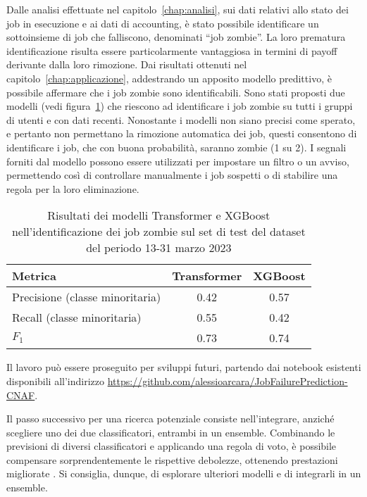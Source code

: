 \label{chap:conclusione}


Dalle analisi effettuate nel capitolo~\ref{chap:analisi}, sui dati relativi
allo stato dei job in esecuzione e ai dati di accounting, è stato possibile
identificare un sottoinsieme di job che falliscono, denominati ``job zombie''.
La loro prematura identificazione risulta essere particolarmente vantaggiosa
in termini di payoff derivante dalla loro rimozione. Dai risultati ottenuti
nel capitolo~\ref{chap:applicazione}, addestrando un apposito modello
predittivo, è possibile affermare che i job zombie sono identificabili. Sono
stati proposti due modelli (vedi figura~\ref{table:model_results}) che
riescono ad identificare i job zombie su tutti i gruppi di utenti e con dati
recenti. Nonostante i modelli non siano precisi come sperato, e pertanto non
permettano la rimozione automatica dei job, questi consentono di identificare
i job, che con buona probabilità, saranno zombie (1 su 2). I segnali forniti
dal modello possono essere utilizzati per impostare un filtro o un avviso,
permettendo così di controllare manualmente i job sospetti o di stabilire una
regola per la loro eliminazione.

\begin{table}[!ht]
    \centering
    \begin{tabular}{lcc}
        \toprule
        Metrica & Transformer & XGBoost \\ 
        \midrule
        Precisione (classe minoritaria) & 0.42 & 0.57 \\ 
        Recall (classe minoritaria) & 0.55 & 0.42 \\ 
        $F_1$ & 0.73 & 0.74 \\ 
        \bottomrule
    \end{tabular}
    \caption{\small Risultati dei modelli Transformer e XGBoost nell'identificazione
    dei job zombie sul set di test del dataset del periodo 13-31 marzo 2023}
    \label{table:model_results}
\end{table}

Il lavoro può essere proseguito per sviluppi futuri, partendo dai notebook
esistenti disponibili all'indirizzo
\url{https://github.com/alessioarcara/JobFailurePrediction-CNAF}.

Il passo successivo per una ricerca potenziale consiste nell'integrare,
anziché scegliere uno dei due classificatori, entrambi in un ensemble.
Combinando le previsioni di diversi classificatori e applicando una regola di
voto, è possibile compensare sorprendentemente le rispettive debolezze,
ottenendo prestazioni migliorate \cite{geron2019}. Si consiglia, dunque, di
esplorare ulteriori modelli e di integrarli in un ensemble.

